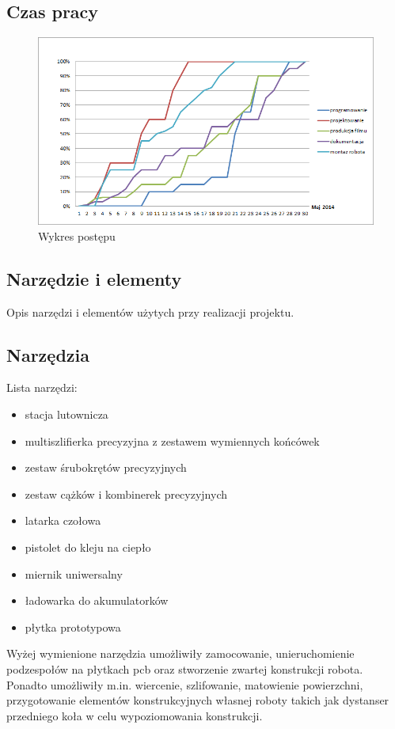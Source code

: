 \documentclass[11pt,a4paper]{article}
\begin{document}
\subsection{Czas pracy}
\begin{figure}[H]
  \includegraphics[scale=0.8]{chart_workprogress}
  \caption{Wykres postępu}
\end{figure}

\subsection{Narzędzie i elementy}
Opis narzędzi i elementów użytych przy realizacji projektu.
\subsection{Narzędzia}
Lista narzędzi:
\begin{itemize}
  \item stacja lutownicza
  \item multiszlifierka precyzyjna z zestawem wymiennych końcówek
  \item zestaw śrubokrętów precyzyjnych
  \item zestaw cążków i kombinerek precyzyjnych
  \item latarka czołowa
  \item pistolet do kleju na ciepło
  \item miernik uniwersalny
  \item ładowarka do akumulatorków
  \item płytka prototypowa
\end{itemize}

Wyżej wymienione narzędzia umożliwiły zamocowanie, unieruchomienie podzespołów na płytkach pcb oraz stworzenie zwartej konstrukcji robota. Ponadto umożliwiły m.in. wiercenie, szlifowanie, matowienie powierzchni, przygotowanie elementów konstrukcyjnych własnej roboty takich jak dystanser przedniego koła w celu wypoziomowania konstrukcji.
\end{document}
